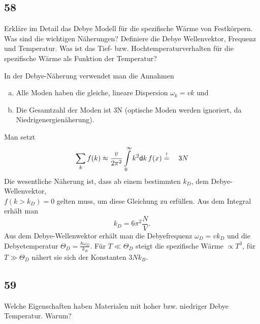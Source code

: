 \subsection{58}
\begin{myfrag}
Erkläre im Detail das Debye Modell für die spezifische Wärme von
Festkörpern. Was sind die wichtigen Näherungen? Definiere die Debye
Wellenvektor, Frequenz und Temperatur. Was ist das Tief- bzw.
Hochtemperaturverhalten für die spezifische Wärme als Funktion der
Temperatur?
\end{myfrag}
In der Debye-Näherung verwendet man die Annahmen
\begin{enumerate}[a)]
	\item Alle Moden haben die gleiche, lineare Dispersion $\omega_k=vk$ und
	\item Die Gesamtzahl der Moden ist 3N (optische Moden werden ignoriert, da Niedrigenergienäherung).
\end{enumerate}
Man setzt
\begin{equation}
	\sum\limits_kf(k)\approx\frac{v}{2\pi^2}\int\limits_0^\infty k^2\dif k\,f(x)\overset!=3N
\end{equation}
Die wesentliche Näherung ist, dass ab einem bestimmten $k_D$, dem Debye-Wellenvektor,\\$f(k>k_D)=0$ gelten muss, um diese Gleichung zu erfüllen. Aus dem Integral erhält man 
\begin{equation}
	k_D=6\pi^2\frac NV.
\end{equation}
Aus dem Debye-Wellenwektor erhält man die Debyefrequenz $\omega_D=vk_D$ und die Debyetemperatur $\Theta_D=\frac{\hbar\omega_D}{k_B}$. Für $T\ll\Theta_D$ steigt die spezifische Wärme $\propto T^3$, für $T\gg\Theta_D$ nähert sie sich der Konstanten $3Nk_B$.
\subsection{59}
\begin{myfrag}
Welche Eigenschaften haben Materialen mit hoher bzw. niedriger Debye
Temperatur. Warum?
\end{myfrag}
